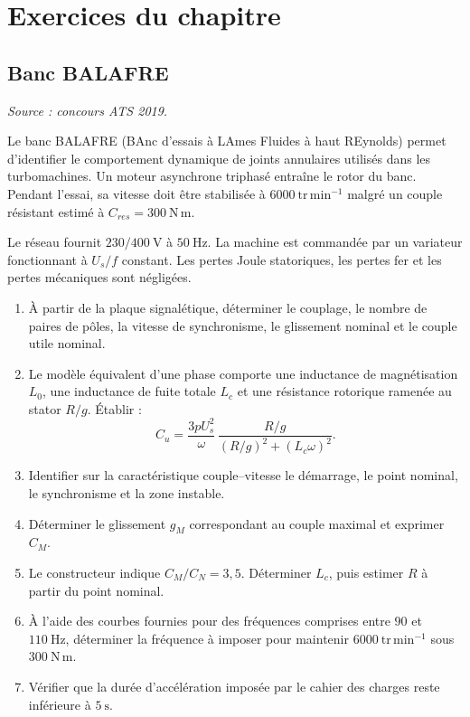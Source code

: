 
\section{Exercices du chapitre}
\label{sec:masms-8}

\subsection{Banc BALAFRE}

\textit{Source : concours ATS 2019.}

\begin{center}
\hfill
{}
\end{center}

Le banc BALAFRE (BAnc d'essais à LAmes Fluides à haut REynolds) permet d'identifier le comportement dynamique de joints annulaires utilisés dans les turbomachines. Un moteur asynchrone triphasé entraîne le rotor du banc. Pendant l'essai, sa vitesse doit être stabilisée à $6000\ \mathrm{tr\,min^{-1}}$ malgré un couple résistant estimé à $C_{res}=300\ \mathrm{N\,m}$.

Le réseau fournit $230/400\ \mathrm V$ à $50\ \mathrm{Hz}$. La machine est commandée par un variateur fonctionnant à $U_s/f$ constant. Les pertes Joule statoriques, les pertes fer et les pertes mécaniques sont négligées.


\begin{enumerate}
  \item À partir de la plaque signalétique, déterminer le couplage, le nombre de paires de pôles, la vitesse de synchronisme, le glissement nominal et le couple utile nominal.
  \item Le modèle équivalent d'une phase comporte une inductance de magnétisation $L_0$, une inductance de fuite totale $L_c$ et une résistance rotorique ramenée au stator $R/g$. Établir :
  \[
  C_u=\frac{3pU_s^2}{\omega}\,
  \frac{R/g}{(R/g)^2+(L_c\omega)^2}.
  \]
  \item Identifier sur la caractéristique couple--vitesse le démarrage, le point nominal, le synchronisme et la zone instable.
  \item Déterminer le glissement $g_M$ correspondant au couple maximal et exprimer $C_M$.
  \item Le constructeur indique $C_M/C_N=3{,}5$. Déterminer $L_c$, puis estimer $R$ à partir du point nominal.
  \item À l'aide des courbes fournies pour des fréquences comprises entre $90$ et $110\ \mathrm{Hz}$, déterminer la fréquence à imposer pour maintenir $6000\ \mathrm{tr\,min^{-1}}$ sous $300\ \mathrm{N\,m}$.
  \item Vérifier que la durée d'accélération imposée par le cahier des charges reste inférieure à $5\ \mathrm s$.
\end{enumerate}

